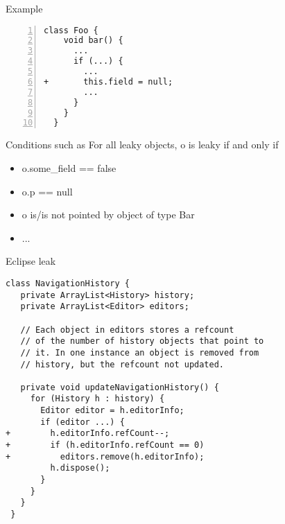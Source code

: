 \begin{frame}[fragile]{Example}%
\begin{center}
\begin{minipage}{0.55\textwidth}
\begin{lstlisting}[frame=single,basicstyle=\footnotesize\ttfamily,numbers=left,numberstyle=\tiny]
  class Foo {
    void bar() {
      ...
      if (...) {
        ...
+       this.field = null;
        ...
      }
    }
  }
  \end{lstlisting}
\end{minipage}
\end{center}
\end{frame}

\begin{frame}{Conditions such as}%
For all leaky objects, o is leaky if and only if
\begin{itemize}
\item o.some\_field == false
\item o.p == null
\item o is/is not pointed by object of type Bar
\item ...
\end{itemize}
\end{frame}

\begin{frame}[fragile,shrink=10]{Eclipse leak}%
\begin{lstlisting}[basicstyle=\footnotesize\ttfamily]
 class NavigationHistory {
   private ArrayList<History> history;
   private ArrayList<Editor> editors;

   // Each object in editors stores a refcount
   // of the number of history objects that point to
   // it. In one instance an object is removed from
   // history, but the refcount not updated.

   private void updateNavigationHistory() {
     for (History h : history) {
       Editor editor = h.editorInfo;
       if (editor ...) {
+        h.editorInfo.refCount--;
+        if (h.editorInfo.refCount == 0)
+          editors.remove(h.editorInfo);
         h.dispose();
       }
     }
   }
 }
\end{lstlisting}
\end{frame}


